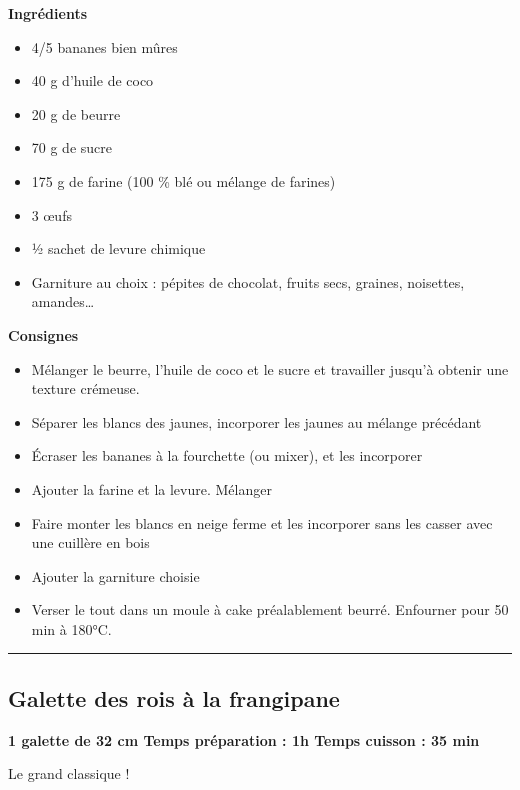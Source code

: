\documentclass[]{book}
\providecommand{\tightlist}{%
  \setlength{\itemsep}{0pt}\setlength{\parskip}{0pt}}
\begin{document}
\textbf{Ingrédients}

\begin{itemize}
\tightlist
\item
  4/5 bananes bien mûres
\item
  40 g d'huile de coco
\item
  20 g de beurre
\item
  70 g de sucre
\item
  175 g de farine (100 \% blé ou mélange de farines)
\item
  3 œufs
\item
  ½ sachet de levure chimique
\item
  Garniture au choix : pépites de chocolat, fruits secs, graines,
  noisettes, amandes\ldots{}
\end{itemize}

\textbf{Consignes}

\begin{itemize}
\tightlist
\item
  Mélanger le beurre, l'huile de coco et le sucre et travailler jusqu'à
  obtenir une texture crémeuse.
\item
  Séparer les blancs des jaunes, incorporer les jaunes au mélange
  précédant
\item
  Écraser les bananes à la fourchette (ou mixer), et les incorporer
\item
  Ajouter la farine et la levure. Mélanger
\item
  Faire monter les blancs en neige ferme et les incorporer sans les
  casser avec une cuillère en bois
\item
  Ajouter la garniture choisie
\item
  Verser le tout dans un moule à cake préalablement beurré. Enfourner
  pour 50 min à 180°C.
\end{itemize}

\begin{center}\rule{0.5\linewidth}{0.5pt}\end{center}

\subsection*{\texorpdfstring{{Galette des rois à la
frangipane}}{Galette des rois à la frangipane}}\label{galette-des-rois-uxe0-la-frangipane}

\begin{sucrebox}
\textbf{1 galette de 32 cm \textbar{} Temps préparation : 1h \textbar{}
Temps cuisson : 35 min}

Le grand classique !
\end{sucrebox}
\end{document}
